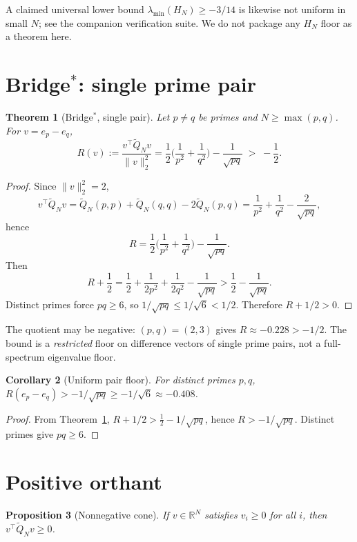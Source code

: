 \documentclass[11pt]{article}
\newtheorem{theorem}{Theorem}[section]
\newtheorem{proposition}[theorem]{Proposition}
\newtheorem{corollary}[theorem]{Corollary}
\newcommand{\Qt}{\widetilde{Q}}
\newcommand{\lmin}{\lambda_{\min}}
\begin{document}
\begin{remark}
A claimed universal lower bound $\lmin(H_N)\ge -3/14$ is likewise not
uniform in small $N$; see the companion verification suite.
We do not package any $H_N$ floor as a theorem here.
\end{remark}

\section{Bridge$^*$: single prime pair}

\begin{theorem}[Bridge$^*$, single pair]\label{thm:bridge}
Let $p\neq q$ be primes and $N\ge\max(p,q)$. For $v=e_p-e_q$,
\[
R(v)
:=\frac{v^\top\Qt_N v}{\|v\|_2^2}
=\frac12\Big(\frac1{p^2}+\frac1{q^2}\Big)-\frac1{\sqrt{pq}}
\;>\;-\frac12.
\]
\end{theorem}

\begin{proof}
Since $\|v\|_2^2=2$,
\[
v^\top\Qt_N v
=\Qt_N(p,p)+\Qt_N(q,q)-2\Qt_N(p,q)
=\frac1{p^2}+\frac1{q^2}-\frac{2}{\sqrt{pq}},
\]
hence
\[
R=\frac12\Big(\frac1{p^2}+\frac1{q^2}\Big)-\frac1{\sqrt{pq}}.
\]
Then
\[
R+\frac12
=\frac12+\frac1{2p^2}+\frac1{2q^2}-\frac1{\sqrt{pq}}
>\frac12-\frac1{\sqrt{pq}}.
\]
Distinct primes force $pq\ge 6$, so $1/\sqrt{pq}\le 1/\sqrt6<1/2$.
Therefore $R+1/2>0$.
\end{proof}

\begin{remark}
The quotient may be negative: $(p,q)=(2,3)$ gives $R\approx -0.228>-1/2$.
The bound is a \emph{restricted} floor on difference vectors of single
prime pairs, not a full-spectrum eigenvalue floor.
\end{remark}

\begin{corollary}[Uniform pair floor]\label{cor:sharp}
For distinct primes $p,q$, $R(e_p-e_q)>-1/\sqrt{pq}\ge -1/\sqrt6\approx -0.408$.
\end{corollary}

\begin{proof}
From Theorem~\ref{thm:bridge}, $R+1/2>\tfrac12-1/\sqrt{pq}$, hence $R>-1/\sqrt{pq}$.
Distinct primes give $pq\ge 6$.
\end{proof}

\section{Positive orthant}

\begin{proposition}[Nonnegative cone]\label{prop:cone}
If $v\in\mathbb{R}^N$ satisfies $v_i\ge 0$ for all $i$, then
$v^\top\Qt_N v\ge 0$.
\end{proposition}
\end{document}
